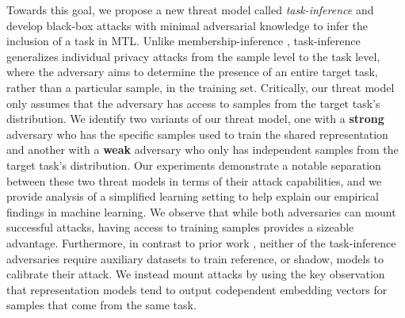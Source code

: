 Towards this goal, we propose a new threat model called \emph{task-inference} and develop black-box attacks with minimal adversarial knowledge to infer the inclusion of a task in MTL. Unlike membership-inference \cite{homer-2008-mi,SankararamanOJH09,dwork-2015-trace,shokri-2016-mi}, task-inference generalizes individual privacy attacks from the sample level to the task level, where the adversary aims to determine the presence of an entire target task, rather than a particular sample, in the training set. Critically, our threat model only assumes that the adversary has access to samples from the target task's distribution. We identify two variants of our threat model, one with a \textbf{strong} adversary who has the specific samples used to train the shared representation and another with a \textbf{weak} adversary who only has independent samples from the target task's distribution. Our experiments demonstrate a notable separation between these two threat models in terms of their attack capabilities,  and we provide analysis of a simplified learning setting to help explain our empirical findings in machine learning. We observe that while both adversaries can mount successful attacks, having access to training samples provides a sizeable advantage. Furthermore, in contrast to prior work \cite{shokri-2016-mi, carlini-2022-lira, 2021-liu-encodermi, chen2023faceauditor, chaudhari-2022-snap, abascal2023tmi, yan2024miamtl}, neither of the task-inference adversaries require auxiliary datasets to train reference, or shadow, models to calibrate their attack. We instead mount attacks by using the key observation that representation models tend to output codependent embedding vectors for samples that come from the same task. 

